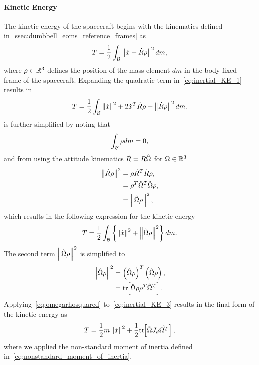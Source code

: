 \paragraph{Kinetic Energy}\label{sec:inertial_kinetic_energy}
The kinetic energy of the spacecraft begins with the kinematics defined in~\cref{ssec:dumbbell_eoms_reference_frames} as
\begin{align}\label{eq:inertial_KE_1}
    T = \frac{1}{2} \int_{\mathcal{B}} \left\|  \dot{x} + \dot{R} \rho \right\|^2 dm,
\end{align}
where \( \rho \in \mathbb{R}^3 \) defines the position of the mass element \( dm \) in the body fixed frame of the spacecraft.
Expanding the quadratic term in~\cref{eq:inertial_KE_1} results in
\begin{align}\label{eq:inertial_KE_2}
T = \frac{1}{2} \int_{\mathcal{B}}  \left\| \dot{x} \right\|^2 + 2 \dot{x}^T \dot{R} \rho + \left\| \dot{R} \rho  \right\|^2    dm .
\end{align}
 is further simplified by noting that
\begin{align*}
    \int_{\mathcal{B}} \rho dm = 0,
\end{align*}
and from using the attitude kinematics \( \dot{R} = R \hat{\Omega} \) for \( \Omega \in \mathbb{R}^3 \) 
\begin{align*}
    \left\| \dot{R} \rho  \right\|^2 &= \rho\dot{R}^T \dot{R} \rho , \\
                                &=  \rho^T \hat{\Omega}^T \hat{\Omega} \rho , \\
                                &= \left\|  \hat{\Omega} \rho  \right\|^2, 
\end{align*}
which results in the following expression for the kinetic energy
\begin{align}\label{eq:inertial_KE_3}
    T = \frac{1}{2} \int_{\mathcal{B}} \left\{  \left\| \dot{x} \right\|^2 + \left\| \hat{\Omega} \rho \right\|^2  \right\} dm.
\end{align}
The second term \( \left\| \hat{\Omega}\rho \right\|^2 \) is simplified to
\begin{align}
    \left\|  \hat{\Omega}\rho  \right\|^2 &= \left(  \hat{\Omega}\rho \right)^T \left( \hat{\Omega}\rho \right) , \nonumber\\
                                    &= \mathrm{tr}\negthickspace\left[  \hat{\Omega} \rho \rho^T \hat{\Omega}^T  \right].\label{eq:omegarhosquared}
\end{align}
Applying~\cref{eq:omegarhosquared} to~\cref{eq:inertial_KE_3} results in the final form of the kinetic energy as
\begin{align}\label{eq:inertial_kinetic_energy}
    T = \frac{1}{2} m \left\| \dot{x} \right\|^2 + \frac{1}{2} \mathrm{tr}\negthickspace\left[  \hat{\Omega}J_d \hat{\Omega^T }  \right], 
\end{align}
where we applied the non-standard moment of inertia defined in~\cref{eq:nonstandard_moment_of_inertia}.

